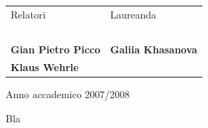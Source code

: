 \documentclass[msc, openright, a4paper]{TNthesis}
\begin{document}
\begin{preliminary}
\begin{titlepage}
\begin{center}
	        \vspace{1.2cm}
	    \end{center}
	\begin{center}
	    \begin{tabular}{ll}
	        \large{Relatori} & \hspace{5 cm} \large{Laureanda}\\
	        \small{\ } & \small{ }\\
	        \large{\textbf{Gian Pietro Picco}} & \hspace{5 cm}
	        								\large{\textbf{Galiia Khasanova}}\\
	        \large{\textbf{Klaus Wehrle}} & \hspace{5 cm}\\
	    \end{tabular}
	\end{center}
	    \vspace{1.3cm}
	    \begin{center}\begin{large}Anno accademico 2007/2008\end{large}\end{center}
\end{titlepage}

\standarddeclaration

\begin{acknowledgements}
	Bla
\end{acknowledgements}


\end{preliminary}
\end{document}
